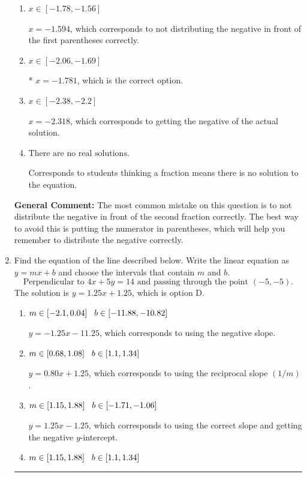 \documentclass{extbook}[14pt]
\newcommand{\litem}[1]{\item #1

\rule{\textwidth}{0.4pt}}
\begin{document}
\begin{enumerate}
{\begin{enumerate}[label=\Alph*.]
$x = 1.594$, which corresponds to not distributing the negative in front of the second parentheses correctly.
\item \( x \in [-1.78, -1.56] \)

$x = -1.594$, which corresponds to not distributing the negative in front of the first parentheses correctly.
\item \( x \in [-2.06, -1.69] \)

* $x = -1.781$, which is the correct option.
\item \( x \in [-2.38, -2.2] \)

$x = -2.318$, which corresponds to getting the negative of the actual solution.
\item \( \text{There are no real solutions.} \)

Corresponds to students thinking a fraction means there is no solution to the equation.
\end{enumerate}

\textbf{General Comment:} The most common mistake on this question is to not distribute the negative in front of the second fraction correctly. The best way to avoid this is putting the numerator in parentheses, which will help you remember to distribute the negative correctly.
}
\litem{
Find the equation of the line described below. Write the linear equation as $ y=mx+b $ and choose the intervals that contain $m$ and $b$.
\[ \text{Perpendicular to } 4 x + 5 y = 14 \text{ and passing through the point } (-5, -5). \]The solution is \( y = 1.25x + 1.25 \), which is option D.\begin{enumerate}[label=\Alph*.]
\item \( m \in [-2.1, 0.04] \hspace*{3mm} b \in [-11.88, -10.82] \)

 $y = -1.25x - 11.25$, which corresponds to using the negative slope.
\item \( m \in [0.68, 1.08] \hspace*{3mm} b \in [1.1, 1.34] \)

 $y = 0.80x + 1.25$, which corresponds to using the reciprocal slope $(1/m)$.
\item \( m \in [1.15, 1.88] \hspace*{3mm} b \in [-1.71, -1.06] \)

 $y = 1.25x - 1.25$, which corresponds to using the correct slope and getting the negative $y$-intercept.
\item \( m \in [1.15, 1.88] \hspace*{3mm} b \in [1.1, 1.34] \)


\end{enumerate}}
\end{enumerate}
\end{document}
